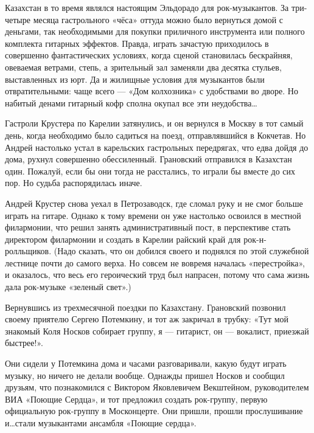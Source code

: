\documentclass[16pt,a5paper,oneside]{book}
\begin{document}
Казахстан в то время являлся настоящим Эльдорадо для рок-музыкантов. За три-четыре месяца гастрольного «чёса» оттуда
можно было вернуться домой с деньгами, так необходимыми для покупки приличного инструмента или полного комплекта
гитарных эффектов. Правда, играть зачастую приходилось в совершенно фантастических условиях, когда сценой становилась
бескрайняя, овеваемая ветрами, степь, а зрительный зал заменяли два десятка стульев, выставленных из юрт. Да и жилищные
условия для музыкантов были отвратительными: чаще всего — «Дом колхозника» с удобствами во дворе. Но набитый денами
гитарный кофр сполна окупал все эти неудобства\ldots

Гастроли Крустера по Карелии затянулись, и он вернулся в Москву в тот самый день, когда необходимо было садиться на
поезд, отправлявшийся в Кокчетав. Но Андрей настолько устал в карельских гастрольных передрягах, что едва дойдя до дома,
рухнул совершенно обессиленный. Грановский отправился в Казахстан один. Пожалуй, если бы они тогда не расстались, то
играли бы вместе до сих пор. Но судьба распорядилась иначе.

Андрей Крустер снова уехал в Петрозаводск, где сломал руку и не смог больше играть на гитаре. Однако к тому времени он
уже настолько освоился в местной филармонии, что решил занять административный пост, в перспективе стать директором
филармонии и создать в Карелии райский край для рок-н-ролльщиков. (Надо сказать, что он добился своего и поднялся по
этой служебной лестнице почти до самого верха. Но совсем не вовремя началась «перестройка», и оказалось, что весь его
героический труд был напрасен, потому что сама жизнь дала рок-музыке «зеленый свет».)

Вернувшись из трехмесячной поездки по Казахстану. Грановский позвонил своему приятелю Сергею Потемкину, и тот аж
закричал в трубку: «Тут мой знакомый Коля Носков собирает группу, я — гитарист, он — вокалист, приезжай быстрее!».

Они сидели у Потемкина дома и часами разговаривали, какую будут играть музыку, но ничего не делали вообще. Однажды
пришел Носков и сообщил друзьям, что познакомился с Виктором Яковлевичем Векштейном, руководителем ВИА «Поющие Сердца»,
и тот предложил создать рок-группу, первую официальную рок-группу в Москонцерте. Они пришли, прошли прослушивание
и\ldots стали музыкантами ансамбля «Поющие сердца».
\end{document}
